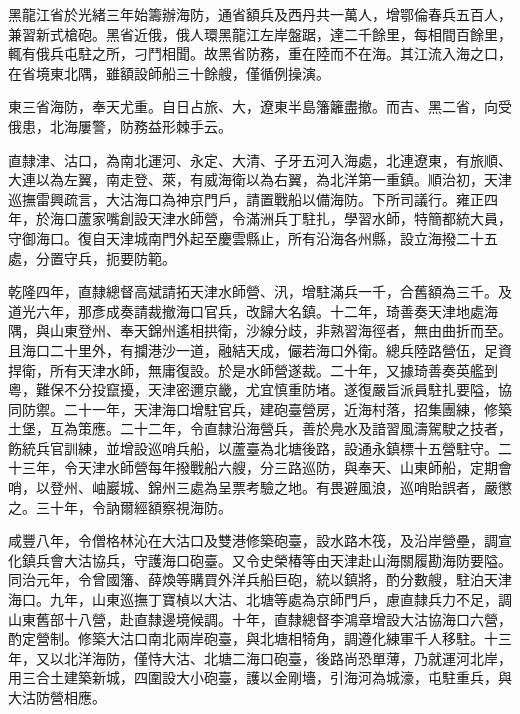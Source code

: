 \begin{pinyinscope}
黑龍江省於光緒三年始籌辦海防，通省額兵及西丹共一萬人，增鄂倫春兵五百人，兼習新式槍砲。黑省近俄，俄人環黑龍江左岸盤踞，達二千餘里，每相間百餘里，輒有俄兵屯駐之所，刁鬥相聞。故黑省防務，重在陸而不在海。其江流入海之口，在省境東北隅，雖額設師船三十餘艘，僅循例操演。

東三省海防，奉天尤重。自日占旅、大，遼東半島籓籬盡撤。而吉、黑二省，向受俄患，北海屢警，防務益形棘手云。

直隸津、沽口，為南北運河、永定、大清、子牙五河入海處，北連遼東，有旅順、大連以為左翼，南走登、萊，有威海衛以為右翼，為北洋第一重鎮。順治初，天津巡撫雷興疏言，大沽海口為神京門戶，請置戰船以備海防。下所司議行。雍正四年，於海口蘆家嘴創設天津水師營，令滿洲兵丁駐扎，學習水師，特簡都統大員，守御海口。復自天津城南門外起至慶雲縣止，所有沿海各州縣，設立海撥二十五處，分置守兵，扼要防範。

乾隆四年，直隸總督高斌請拓天津水師營、汛，增駐滿兵一千，合舊額為三千。及道光六年，那彥成奏請裁撤海口官兵，改歸大名鎮。十二年，琦善奏天津地處海隅，與山東登州、奉天錦州遙相拱衛，沙線分歧，非熟習海徑者，無由曲折而至。且海口二十里外，有攔港沙一道，融結天成，儼若海口外衛。總兵陸路營伍，足資捍衛，所有天津水師，無庸復設。於是水師營遂裁。二十年，又據琦善奏英艦到粵，難保不分投竄擾，天津密邇京畿，尤宜慎重防堵。遂復嚴旨派員駐扎要隘，協同防禦。二十一年，天津海口增駐官兵，建砲臺營房，近海村落，招集團練，修築土堡，互為策應。二十二年，令直隸沿海營兵，善於鳧水及諳習風濤駕駛之技者，飭統兵官訓練，並增設巡哨兵船，以蘆臺為北塘後路，設通永鎮標十五營駐守。二十三年，令天津水師營每年撥戰船六艘，分三路巡防，與奉天、山東師船，定期會哨，以登州、岫巖城、錦州三處為呈票考驗之地。有畏避風浪，巡哨貽誤者，嚴懲之。三十年，令訥爾經額察視海防。

咸豐八年，令僧格林沁在大沽口及雙港修築砲臺，設水路木筏，及沿岸營壘，調宣化鎮兵會大沽協兵，守護海口砲臺。又令史榮椿等由天津赴山海關履勘海防要隘。同治元年，令曾國籓、薛煥等購買外洋兵船巨砲，統以鎮將，酌分數艘，駐泊天津海口。九年，山東巡撫丁寶楨以大沽、北塘等處為京師門戶，慮直隸兵力不足，調山東舊部十八營，赴直隸邊境候調。十年，直隸總督李鴻章增設大沽協海口六營，酌定營制。修築大沽口南北兩岸砲臺，與北塘相犄角，調遵化練軍千人移駐。十三年，又以北洋海防，僅恃大沽、北塘二海口砲臺，後路尚恐單薄，乃就運河北岸，用三合土建築新城，四圍設大小砲臺，護以金剛墻，引海河為城濠，屯駐重兵，與大沽防營相應。


\end{pinyinscope}
